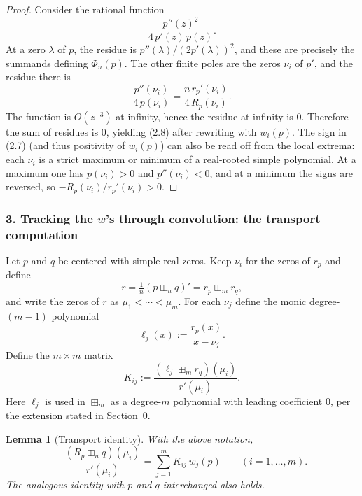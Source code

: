 \documentclass{article}
\newtheorem{lemma}{Lemma}[section]
\begin{document}
\begin{proof}
Consider the rational function
\[
  \frac{p''(z)^2}{4\,p'(z)\,p(z)}.
\]
At a zero $\lambda$ of $p$, the residue is $p''(\lambda)/(2p'(\lambda))^2$, and these are precisely the summands defining $\Phi_n(p)$. The other finite poles are the zeros $\nu_i$ of $p'$, and the residue there is
\[
  \frac{p''(\nu_i)}{4\,p(\nu_i)} = \frac{n\,r_p'(\nu_i)}{4\,R_p(\nu_i)}.
\]
The function is $O(z^{-3})$ at infinity, hence the residue at infinity is $0$. Therefore the sum of residues is $0$, yielding (2.8) after rewriting with $w_i(p)$. The sign in (2.7) (and thus positivity of $w_i(p)$) can also be read off from the local extrema: each $\nu_i$ is a strict maximum or minimum of a real-rooted simple polynomial. At a maximum one has $p(\nu_i) > 0$ and $p''(\nu_i) < 0$, and at a minimum the signs are reversed, so $-R_p(\nu_i)/r_p'(\nu_i) > 0$.
\end{proof}

\subsubsection*{3. Tracking the $w$'s through convolution: the transport computation}

Let $p$ and $q$ be centered with simple real zeros. Keep $\nu_i$ for the zeros of $r_p$ and define
\begin{equation}
  r = \tfrac{1}{n}(p \boxplus_n q)' = r_p \boxplus_m r_q, \tag{2.9}
\end{equation}
and write the zeros of $r$ as $\mu_1 < \cdots < \mu_m$. For each $\nu_j$ define the monic degree-$(m-1)$ polynomial
\begin{equation}
  \ell_j(x) := \frac{r_p(x)}{x - \nu_j}. \tag{2.10}
\end{equation}
Define the $m \times m$ matrix
\begin{equation}
  K_{ij} := \frac{(\ell_j \boxplus_m r_q)(\mu_i)}{r'(\mu_i)}. \tag{2.11}
\end{equation}
Here $\ell_j$ is used in $\boxplus_m$ as a degree-$m$ polynomial with leading coefficient $0$, per the extension stated in Section~0.

\begin{lemma}[Transport identity]\label{lem:transport}
With the above notation,
\begin{equation}
  -\frac{(R_p \boxplus_n q)(\mu_i)}{r'(\mu_i)} = \sum_{j=1}^{m} K_{ij}\,w_j(p) \qquad (i = 1, \ldots, m). \tag{2.12}
\end{equation}
The analogous identity with $p$ and $q$ interchanged also holds.
\end{lemma}
\end{document}
